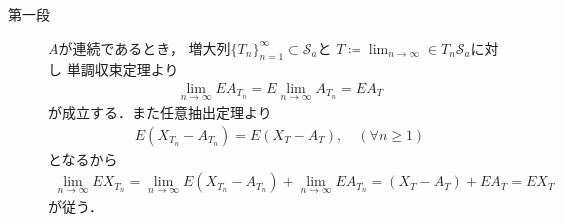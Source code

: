 	\begin{prf}\mbox{}
		\begin{description}
			\item[第一段] $A$が連続であるとき，
				増大列$\{T_n\}_{n=1}^\infty \subset \mathscr{S}_a$と
				$T \coloneqq \lim_{n \to \infty} \in T_n \mathscr{S}_a$に対し
				単調収束定理より
				\begin{align}
					\lim_{n \to \infty} EA_{T_n}
					= E \lim_{n \to \infty} A_{T_n}
					= EA_T
				\end{align}
				が成立する．また任意抽出定理より
				\begin{align}
					E(X_{T_n} - A_{T_n}) = E(X_{T} - A_{T}),
					\quad (\forall n \geq 1)
				\end{align}
				となるから
				\begin{align}
					\lim_{n \to \infty} EX_{T_n} 
					= \lim_{n \to \infty} E(X_{T_n} - A_{T_n}) + \lim_{n \to \infty} EA_{T_n} 
					= (X_{T} - A_{T}) + EA_T
					= EX_T
				\end{align}
				が従う．
				

\end{description}
\end{prf}
